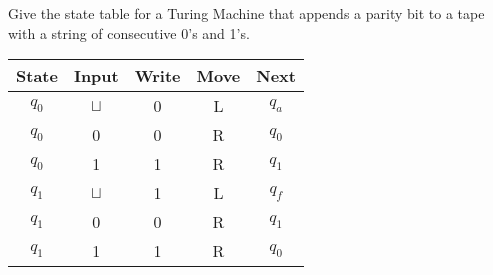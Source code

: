 \documentclass[a4paper, 12pt]{exam}
\begin{document}
\begin{questions}
\begin{solution}
  \end{solution}


\question
  Give the state table for a Turing Machine that appends a parity bit to a tape with a string of consecutive 0's and 1's.
  \begin{solution}
    \begin{table}[H]
      \centering
      \begin{tabular}{ccccc}
        \toprule
            State & Input & Write & Move & Next \\
        \midrule
            $q_0$ & $\sqcup$ & 0 & L & $q_a$ \\
            $q_0$ & 0 & 0 & R & $q_0$ \\
            $q_0$ & 1 & 1 & R & $q_1$ \\
        \midrule
            $q_1$ & $\sqcup$ & 1 & L & $q_f$ \\
            $q_1$ & 0 & 0 & R & $q_1$ \\
            $q_1$ & 1 & 1 & R & $q_0$ \\
        \bottomrule
        \hline
      \end{tabular}
    \end{table}
  \end{solution}



\end{questions}
\end{document}
